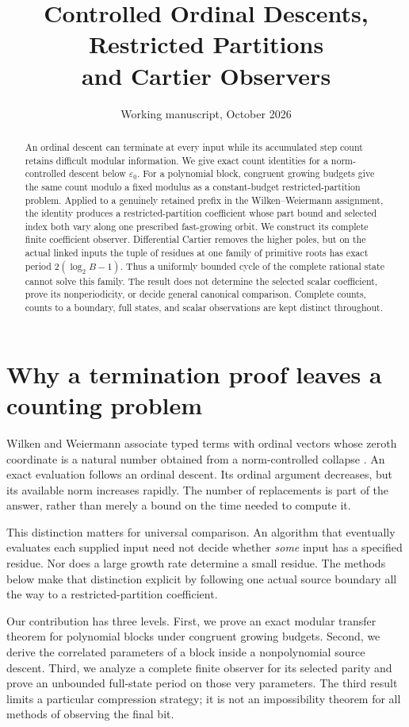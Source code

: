 \documentclass[11pt]{article}
\title{Controlled Ordinal Descents, Restricted Partitions\\and Cartier Observers}
\author{}
\date{Working manuscript, October 2026}
\begin{document}
\maketitle
\begin{abstract}
An ordinal descent can terminate at every input while its accumulated
step count retains difficult modular information. We give exact count
identities for a norm-controlled descent below $\varepsilon _0$. For a
polynomial block, congruent growing budgets give the same count modulo a
fixed modulus as a constant-budget restricted-partition problem. Applied
to a genuinely retained prefix in the Wilken--Weiermann assignment, the
identity produces a restricted-partition coefficient whose part bound
and selected index both vary along one prescribed fast-growing orbit.
We construct its complete finite coefficient observer. Differential
Cartier removes the higher poles, but on the actual linked inputs the
tuple of residues at one family of primitive roots has exact period
$2(\log _2 B-1)$. Thus a uniformly bounded cycle of the complete rational
state cannot solve this family. The result does not determine the
selected scalar coefficient, prove its nonperiodicity, or decide general
canonical comparison. Complete counts, counts to a boundary, full states,
and scalar observations are kept distinct throughout.
\end{abstract}
\tableofcontents

\section{Why a termination proof leaves a counting problem}

Wilken and Weiermann associate typed terms with ordinal vectors whose
zeroth coordinate is a natural number obtained from a norm-controlled
collapse \cite{ww}. An exact evaluation follows an ordinal descent. Its
ordinal argument decreases, but its available norm increases rapidly.
The number of replacements is part of the answer, rather than merely a
bound on the time needed to compute it.

This distinction matters for universal comparison. An algorithm that
eventually evaluates each supplied input need not decide whether
\emph{some} input has a specified residue. Nor does a large growth rate
determine a small residue. The methods below make that distinction
explicit by following one actual source boundary all the way to a
restricted-partition coefficient.

Our contribution has three levels. First, we prove an exact modular
transfer theorem for polynomial blocks under congruent growing budgets.
Second, we derive the correlated parameters of a block inside a
nonpolynomial source descent. Third, we analyze a complete finite
observer for its selected parity and prove an unbounded full-state
period on those very parameters. The third result limits a particular
compression strategy; it is not an impossibility theorem for all
methods of observing the final bit.
\end{document}
